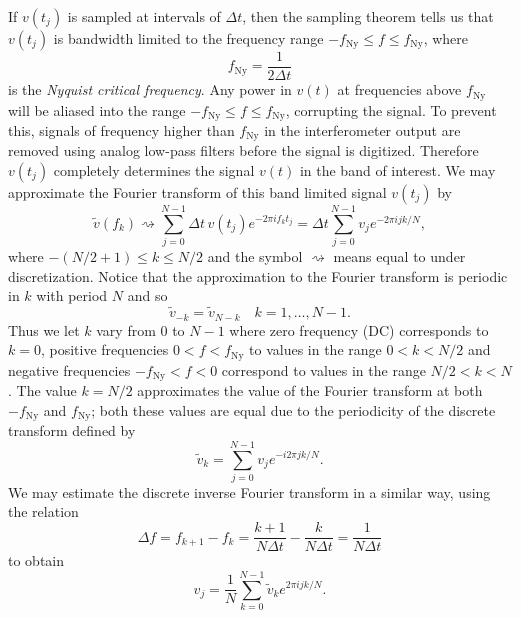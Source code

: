 If $v(t_j)$ is sampled at intervals of $\Delta t$, then the sampling
theorem\cite{Press:1992} tells us that $v(t_j)$ is bandwidth limited to the
frequency range $-f_\mathrm{Ny} \le f \le f_\mathrm{Ny}$, where
\begin{equation}
f_\mathrm{Ny} = \frac{1}{2\Delta t}
\end{equation}
is the \emph{Nyquist critical frequency}. Any power in $v(t)$ at frequencies
above $f_\mathrm{Ny}$ will be aliased into the range $-f_\mathrm{Ny} \le f
\le f_\mathrm{Ny}$, corrupting the signal. To prevent this, signals of
frequency higher than $f_\mathrm{Ny}$ in the interferometer output are removed
using analog low-pass filters before the signal is digitized. Therefore
$v(t_j)$ completely determines the signal $v(t)$ in the band of interest. We
may approximate the Fourier transform of this band limited signal $v(t_j)$ by
\begin{equation}
\tilde{v}(f_k) \rightsquigarrow \sum_{j=0}^{N-1} \Delta t\, v(t_j) e^{-2 \pi i f_k t_j}
= \Delta t \sum_{j=0}^{N-1} v_j e^{-2 \pi i j k / N},
\label{eq:fftapprox}
\end{equation}
where $-(N/2 + 1) \le k \le N/2$ and the symbol $\rightsquigarrow$ means
equal to under discretization.  Notice that the approximation to the
Fourier transform is periodic in $k$ with period $N$ and so 
\begin{equation}
\tilde{v}_{-k} = \tilde{v}_{N-k}\quad k = 1, \ldots, N - 1.
\end{equation}
Thus we let $k$ vary from $0$ to $N-1$ where zero frequency (DC) corresponds
to $k=0$, positive frequencies $0 < f < f_\mathrm{Ny}$ to values in the range
$0 < k < N/2$ and negative frequencies $-f_\mathrm{Ny} < f < 0$ correspond
to values in the range $N/2 < k < N$. The value $k = N/2$ approximates the
value of the Fourier transform at both $-f_\mathrm{Ny}$ and $f_\mathrm{Ny}$;
both these values are equal due to the periodicity of the discrete transform 
defined by\cite{Anderson:2001a}
\begin{equation}
\tilde{v}_k = \sum_{j=0}^{N-1} v_j e^{-i 2 \pi j k / N}.
\label{eq:dftdef}
\end{equation}
We may estimate the discrete inverse Fourier transform
in a similar way, using the relation
\begin{equation}
\Delta f = f_{k+1} - f_k = \frac{k+1}{N\Delta t} - \frac{k}{N\Delta t} =
\frac{1}{N\Delta t}
\end{equation}
to obtain
\begin{equation}
v_j = \frac{1}{N} \sum_{k=0}^{N-1} \tilde{v}_k e^{2 \pi i j k / N}.
\end{equation}

